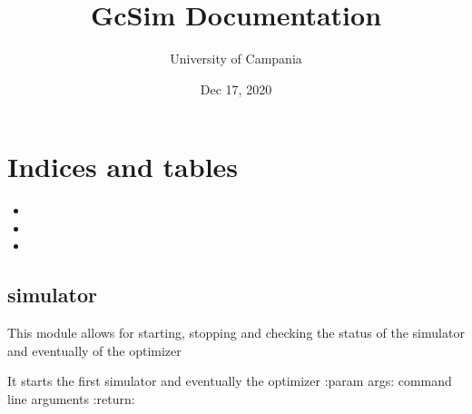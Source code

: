 \documentclass[letterpaper,10pt,english]{sphinxmanual}
\title{GcSim Documentation}
\date{Dec 17, 2020}
\author{University of Campania}
\begin{document}
\pagestyle{empty}
\sphinxmaketitle
\pagestyle{plain}
\sphinxtableofcontents
\pagestyle{normal}
\label{\detokenize{index::doc}}



\chapter{Indices and tables}
\label{\detokenize{index:indices-and-tables}}\begin{itemize}
\item {} 

\item {} 

\item {} 

\end{itemize}
\label{\detokenize{index:module-simulator}}

\section{simulator}
\label{\detokenize{index:simulator}}
This  module allows for starting, stopping and checking the status of the simulator and eventually of the optimizer

\begin{fulllineitems}
\label{\detokenize{index:simulator.start}}
It starts  the first simulator and eventually the optimizer
:param args: command line arguments
:return:

\end{fulllineitems}

\end{document}
